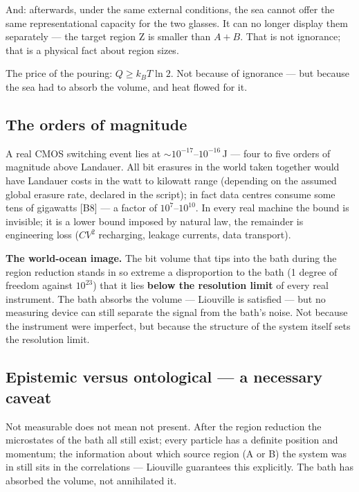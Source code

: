 And: afterwards, under the same external conditions, the sea cannot offer the same
representational capacity for the two glasses. It can no longer display them
separately --- the target region Z is smaller than $A+B$. That is not ignorance;
that is a physical fact about region sizes.

The price of the pouring: $Q \ge k_B T \ln 2$. Not because of ignorance --- but
because the sea had to absorb the volume, and heat flowed for it.

\subsection{The orders of magnitude}

\LK {} A real CMOS switching event lies at
${\sim}10^{-17}$--$10^{-16}$\,J --- four to five orders of magnitude above
Landauer. All bit erasures in the world taken together would have Landauer costs
in the watt to kilowatt range (depending on the assumed global erasure rate,
declared in the script); in fact data centres consume some tens of gigawatts [B8]
--- a factor of $10^{7}$--$10^{10}$. In every real machine the bound is invisible;
it is a lower bound imposed by natural law, the remainder is engineering loss
($CV^2$ recharging, leakage currents, data transport).

\LK \textbf{The world-ocean image.} The bit volume that tips into the bath during
the region reduction stands in so extreme a disproportion to the bath (1 degree of
freedom against $10^{23}$) that it lies \textbf{below the resolution limit} of
every real instrument. The bath absorbs the volume --- Liouville is satisfied ---
but no measuring device can still separate the signal from the bath's noise. Not
because the instrument were imperfect, but because the structure of the system
itself sets the resolution limit.

\subsection{Epistemic versus ontological --- a necessary caveat}

\LB Not measurable does not mean not present. After the region reduction the
microstates of the bath all still exist; every particle has a definite position
and momentum; the information about which source region (A or B) the system was in
still sits in the correlations --- Liouville guarantees this explicitly. The bath
has absorbed the volume, not annihilated it.

